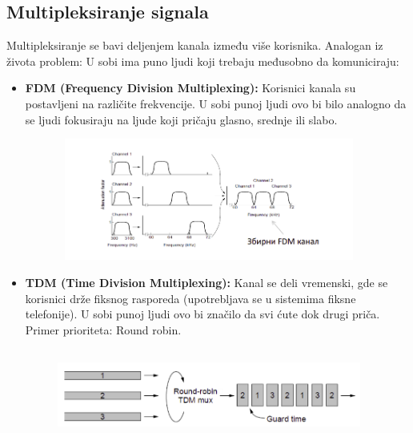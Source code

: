 \documentclass[a4paper]{article}
\begin{document}
    \subsection{Multipleksiranje signala}
        Multipleksiranje se bavi deljenjem kanala između više korisnika. Analogan iz života problem:
        U sobi ima puno ljudi koji trebaju međusobno da komuniciraju:
        \begin{itemize}
            \item \textbf{FDM (Frequency Division Multiplexing):} Korisnici kanala su postavljeni na 
                  različite frekvencije. U sobi punoj ljudi ovo bi bilo analogno da se ljudi
                  fokusiraju na ljude koji pričaju glasno, srednje ili slabo.
                  \begin{figure}[H]
                    \begin{center}
                        \includegraphics[width=100mm,height=40mm]{Slike/fdm.png}
                    \end{center}
                  \end{figure}
            \item \textbf{TDM (Time Division Multiplexing):} Kanal se deli vremenski, gde se korisnici
                  drže fiksnog rasporeda (upotrebljava se u sistemima fiksne telefonije). U sobi punoj 
                  ljudi ovo bi značilo da svi ćute dok drugi priča. Primer prioriteta: Round robin.
                  \begin{figure}[H]
                    \begin{center}
                        \includegraphics[width=100mm,height=30mm]{Slike/round_robin.png}
                    \end{center}
                  \end{figure}

\end{itemize}
\end{document}
